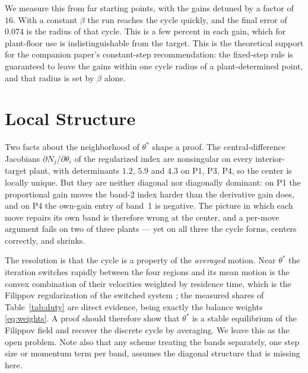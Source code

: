 \documentclass[letterpaper, 10pt, conference, twocolumn]{ieeeconf}
\begin{document}
We measure this from far starting points, with the gains detuned by a factor
of $16$. With a constant $\beta$ the run reaches the cycle quickly, and the
final error of $0.074$ is the radius of that cycle. This is a few percent in
each gain, which for
plant-floor use is indistinguishable from the target. This is the theoretical
support for the companion paper's constant-step recommendation: the fixed-step
rule is guaranteed to leave the gains within one cycle radius of a
plant-determined point, and that radius is set by $\beta$ alone.

\section{Local Structure}
\label{sec:structure}

Two facts about the neighborhood of $\theta^*$ shape a proof. The
central-difference Jacobians $\partial N_j/\partial\theta_i$ of the regularized
index are nonsingular on every interior-target plant, with determinants $1.2$,
$5.9$ and $4.3$ on P1, P3, P4, so the center is locally unique. But they are
neither diagonal nor diagonally dominant: on P1 the proportional gain moves the
band-2 index harder than the derivative gain does, and on P4 the own-gain entry
of band~1 is negative. The picture in which each move repairs its own band is
therefore wrong at the center, and a per-move argument fails on two of three
plants --- yet on all three the cycle forms, centers correctly, and shrinks.

The resolution is that the cycle is a property of the \emph{averaged} motion.
Near $\theta^*$ the iteration switches rapidly between the four regions and its
mean motion is the convex combination of their velocities weighted by residence
time, which is the Filippov regularization of the switched system
\cite{Filippov1988}; the measured shares of Table~\ref{tab:duty} are direct
evidence, being exactly the balance weights \eqref{eq:weights}. A proof should
therefore show that $\theta^*$ is a stable equilibrium of the Filippov field
and recover the discrete cycle by averaging. We leave this as the open problem.
Note also that any scheme treating the bands separately, one step size or
momentum term per band, assumes the diagonal structure that is missing here.
\end{document}
